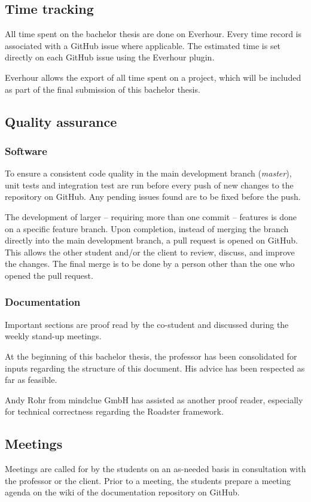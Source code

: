 \subsection{Time tracking}
All time spent on the bachelor thesis are done on Everhour. Every time record
is associated with a GitHub issue where applicable.
The estimated time is set directly on each GitHub issue using the Everhour plugin.

Everhour allows the export of all time spent on a project, which will be
included as part of the final submission of this bachelor thesis.

\subsection{Quality assurance}


\subsubsection{Software}
To ensure a consistent code quality in the main development branch
(\emph{master}), unit tests and integration test are run before every push of
new changes to the repository on GitHub. Any pending issues found are to be
fixed before the push.


The development of larger -- requiring more than one commit -- features is done
on a specific feature branch.  Upon completion, instead of merging the branch
directly into the main development branch, a pull request is opened on GitHub.
This allows the other student and/or the client to review, discuss, and improve
the changes. The final merge is to be done by a person other than the one who
opened the pull request.

\subsubsection{Documentation}
Important sections are proof read by the co-student and discussed during the
weekly stand-up meetings.

At the beginning of this bachelor thesis, the professor has been consolidated
for inputs regarding the structure of this document. His advice has been
respected as far as feasible.

Andy Rohr from mindclue GmbH has assisted as another proof reader, especially
for technical correctness regarding the Roadster framework.


\subsection{Meetings}
Meetings are called for by the students on an as-needed basis in consultation
with the professor or the client. Prior to a meeting, the students prepare a meeting
agenda on the wiki of the documentation repository on GitHub.

